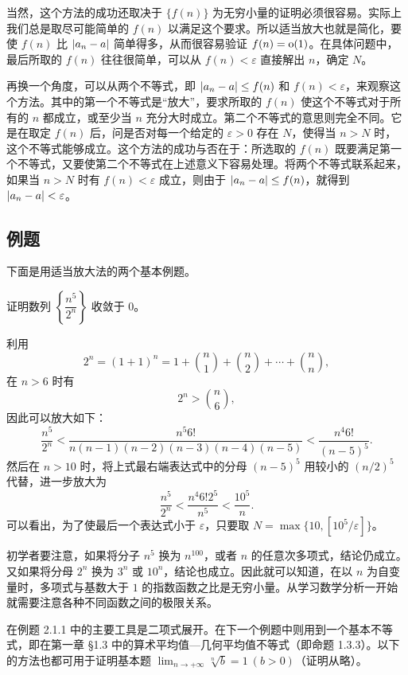 当然，这个方法的成功还取决于 $\{f(n)\}$ 为无穷小量的证明必须很容易。实际上我们总是取尽可能简单的 $f(n)$ 以满足这个要求。所以适当放大也就是简化，要使 $f(n)$ 比 $\lvert a_n-a\rvert$ 简单得多，从而很容易验证 $f(n)=\mathrm{o}(1)$。在具体问题中，最后所取的 $f(n)$ 往往很简单，可以从 $f(n)<\varepsilon$ 直接解出 $n$，确定 $N$。

再换一个角度，可以从两个不等式，即 $\lvert a_n-a\rvert\le f(n)$ 和 $f(n)<\varepsilon$，来观察这个方法。其中的第一个不等式是“放大”，要求所取的 $f(n)$ 使这个不等式对于所有的 $n$ 都成立，或至少当 $n$ 充分大时成立。第二个不等式的意思则完全不同。它是在取定 $f(n)$ 后，问是否对每一个给定的 $\varepsilon>0$ 存在 $N$，使得当 $n>N$ 时，这个不等式能够成立。这个方法的成功与否在于：所选取的 $f(n)$ 既要满足第一个不等式，又要使第二个不等式在上述意义下容易处理。将两个不等式联系起来，如果当 $n>N$ 时有 $f(n)<\varepsilon$ 成立，则由于 $\lvert a_n-a\rvert\le f(n)$，就得到 $\lvert a_n-a\rvert<\varepsilon$。

\subsection{例题}

下面是用适当放大法的两个基本例题。

\begin{xexample}[2.1.1]
证明数列 $\left\{\dfrac{n^5}{2^n}\right\}$ 收敛于 $0$。
\end{xexample}
\begin{xproof}
利用
\[
  2^n=(1+1)^n=1+\binom n1+\binom n2+\cdots+\binom nn,
\]
在 $n>6$ 时有
\[
  2^n>\binom n6,
\]
因此可以放大如下：
\[
  \frac{n^5}{2^n}
  <\frac{n^5 6!}{n(n-1)(n-2)(n-3)(n-4)(n-5)}
  <\frac{n^4 6!}{(n-5)^5}.
\]
然后在 $n>10$ 时，将上式最右端表达式中的分母 $(n-5)^5$ 用较小的 $(n/2)^5$ 代替，进一步放大为
\[
  \frac{n^5}{2^n}<\frac{n^4 6!2^5}{n^5}<\frac{10^5}{n}.
\]
可以看出，为了使最后一个表达式小于 $\varepsilon$，只要取 $N=\max\{10,[10^5/\varepsilon]\}$。
\end{xproof}

\begin{xremark}
初学者要注意，如果将分子 $n^5$ 换为 $n^{100}$，或者 $n$ 的任意次多项式，结论仍成立。又如果将分母 $2^n$ 换为 $3^n$ 或 $10^n$，结论也成立。因此就可以知道，在以 $n$ 为自变量时，多项式与基数大于 $1$ 的指数函数之比是无穷小量。从学习数学分析一开始就需要注意各种不同函数之间的极限关系。
\end{xremark}

在例题 2.1.1 中的主要工具是二项式展开。在下一个例题中则用到一个基本不等式，即在第一章 §1.3 中的算术平均值—几何平均值不等式（即命题 1.3.3）。以下的方法也都可用于证明基本题 $\displaystyle\lim_{n\to+\infty}\sqrt[n]{b}=1\ (b>0)$（证明从略）。

